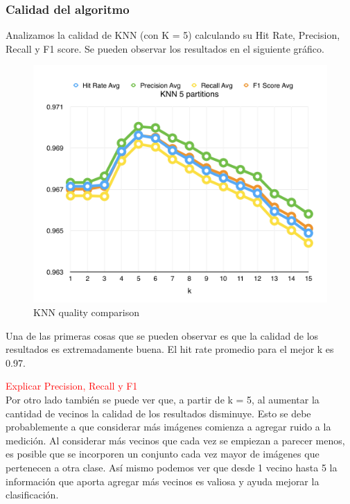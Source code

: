 \subsubsection{Calidad del algoritmo}

Analizamos la calidad de KNN (con K = 5) calculando su Hit Rate, Precision, Recall y F1 score. Se pueden observar los resultados en el siguiente gráfico.

\begin{figure}[h!]
  \begin{center}
	\includegraphics[scale=0.7]{exp1/KNN-5p-Scores.png}
	\caption{KNN quality comparison}
  \end{center}
\end{figure}

Una de las primeras cosas que se pueden observar es que la calidad de los resultados es extremadamente buena. El hit rate promedio para el mejor k es 0.97.

\textcolor{red}{Explicar Precision, Recall y F1}\\

Por otro lado también se puede ver que, a partir de k = 5, al aumentar la cantidad de vecinos la calidad de los resultados disminuye. Esto se debe probablemente a que considerar más imágenes comienza a agregar ruido a la medición. Al considerar más vecinos que cada vez se empiezan a parecer menos, es posible que se incorporen un conjunto cada vez mayor de imágenes que pertenecen a otra clase. Así mismo podemos ver que desde 1 vecino hasta 5 la información que aporta agregar más vecinos es valiosa y ayuda mejorar la clasificación.\\

